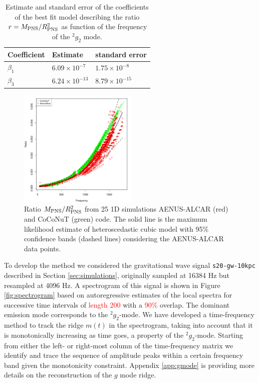 \begin{table}[h]
  \begin{tabular}{lll}
    \hline
    Coefficient & Estimate & standard error \\
    \hline
    $\beta_1$   & $6.09 \times 10^{-7}$ & $1.75 \times 10^{-8}$ \\
    $\beta_3$   & $6.24 \times 10^{-13}$ & $8.79 \times 10^{-15}$ \\
    \hline
  \end{tabular}
\caption{Estimate and standard error of the coefficients of the best fit model describing the ratio $r=M_{\rm PNS}/R_{\rm PNS}^2$ as function of the frequency of the $\mbox{}^2g_2$ mode.}\label{tab:model}
\end{table}

\begin{figure}
 \centering
 \includegraphics[width=0.5\textwidth]{plots/model}
 \caption{Ratio $M_{\rm PNS}/R_{\rm PNS}^2$ from 25 1D simulations {\sc AENUS-ALCAR} (red) and {\sc CoCoNuT} (green) code. The solid line is the maximum likelihood estimate of heteroscedastic cubic model with 95\% confidence bands (dashed lines) considering the {\sc AENUS-ALCAR} data points.} \label{fig:LMVAR}
\end{figure}

To develop the method we considered the gravitational wave signal
{\tt s20-gw-10kpc} described in Section \ref{sec:simulations}, originally
sampled at 16384 Hz but resampled at 4096 Hz.
A spectrogram of this signal is shown in Figure \ref{fig:spectrogram} based on
autoregressive estimates of the local spectra for successive time intervals of 
\textcolor{red}{length 200} with a \textcolor{red}{ 90\%} overlap.
The dominant emission mode corresponds to the $\mbox{}^2 g_2$-mode. We have
developed a time-frequency method to track the ridge $m(t)$ in the spectrogram,
taking into account that it is monotonically increasing as time goes,
a property of the $\mbox{}^2 g_2$-mode.
Starting from either the left- or right-most column of the time-frequency matrix
we identify and trace the sequence of amplitude peaks within a certain frequency
band given the monotonicity constraint. Appendix \ref{app:gmode} is providing more
details on the reconstruction of the $g$ mode ridge. 


